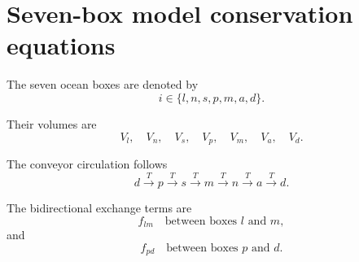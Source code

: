 \documentclass[11pt]{article}
\begin{document}
\newpage

%
%
%
%
%
%
%
%
%
%
%
%
%
%
%

\section{Seven-box model conservation equations}

The seven ocean boxes are denoted by
\begin{equation}
i\in\{l,n,s,p,m,a,d\}.
\end{equation}

Their volumes are
\begin{equation}
V_l,\quad
V_n,\quad
V_s,\quad
V_p,\quad
V_m,\quad
V_a,\quad
V_d.
\end{equation}

The conveyor circulation follows
\begin{equation}
d
\xrightarrow{T}
p
\xrightarrow{T}
s
\xrightarrow{T}
m
\xrightarrow{T}
n
\xrightarrow{T}
a
\xrightarrow{T}
d.
\label{eq:seven_conveyor}
\end{equation}

The bidirectional exchange terms are
\begin{equation}
f_{lm}
\quad\text{between boxes }l\text{ and }m,
\end{equation}
and
\begin{equation}
f_{pd}
\quad\text{between boxes }p\text{ and }d.
\end{equation}
\end{document}
